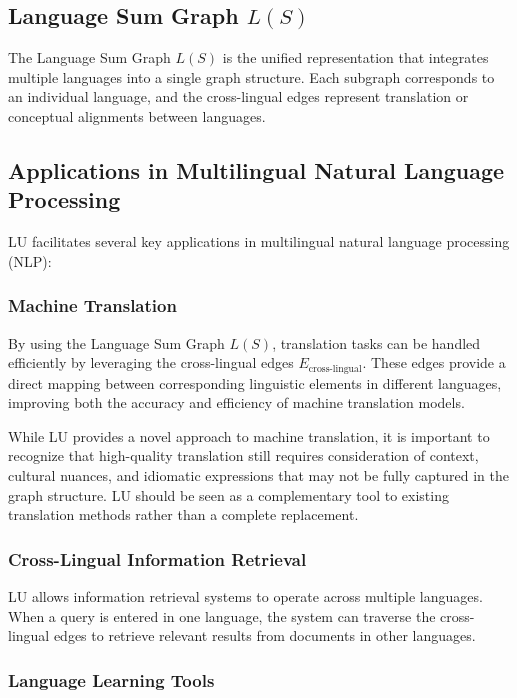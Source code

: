 \subsection{Language Sum Graph $L(S)$}

The Language Sum Graph $L(S)$ is the unified representation that integrates multiple languages into a single graph structure. Each subgraph corresponds to an individual language, and the cross-lingual edges represent translation or conceptual alignments between languages.


\subsection{Applications in Multilingual Natural Language Processing}

LU facilitates several key applications in multilingual natural language processing (NLP):

\subsubsection{Machine Translation}

By using the Language Sum Graph $L(S)$, translation tasks can be handled efficiently by leveraging the cross-lingual edges $E_{\text{cross-lingual}}$. These edges provide a direct mapping between corresponding linguistic elements in different languages, improving both the accuracy and efficiency of machine translation models.

While LU provides a novel approach to machine translation, it is important to recognize that high-quality translation still requires consideration of context, cultural nuances, and idiomatic expressions that may not be fully captured in the graph structure. LU should be seen as a complementary tool to existing translation methods rather than a complete replacement.

\subsubsection{Cross-Lingual Information Retrieval}

LU allows information retrieval systems to operate across multiple languages. When a query is entered in one language, the system can traverse the cross-lingual edges to retrieve relevant results from documents in other languages.

\subsubsection{Language Learning Tools}

